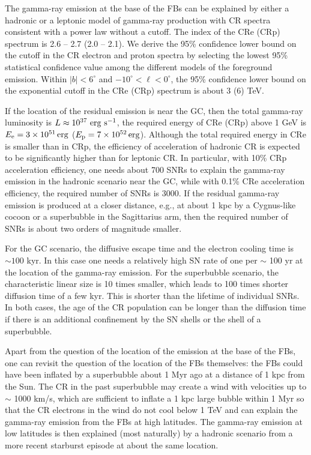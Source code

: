The gamma-ray emission at the base of the FBs can be explained by either a hadronic or a leptonic model of gamma-ray production
with CR spectra consistent with a power law without a cutoff.
The index of the CRe (CRp) spectrum is 2.6 -- 2.7 (2.0 -- 2.1).
We derive the 95\% confidence lower bound on the cutoff in the CR electron and proton spectra
by selecting the lowest 95\% statistical confidence value among the different models of the foreground emission.
Within $|b| < 6^\circ$ and $-10^\circ < \ell < 0^\circ$, the 95\% confidence lower bound on the 
exponential cutoff in the CRe (CRp) spectrum is
about 3 (6) TeV.

If the location of the residual emission is near the GC,
then the total gamma-ray luminosity is $L \approx 10^{37}\ {\rm erg\ s^{-1}}$,
the required energy of CRe (CRp) above 1 GeV is $E_{\rm e} = \SI{3e51}{erg}$
($E_{\rm p} = \SI{7e52}{erg}$).
Although the total required energy in CRe is smaller than in CRp,
the efficiency of acceleration of hadronic CR is expected to be significantly higher than for leptonic CR.
In particular, with 10\% CRp acceleration efficiency, one needs about 700 SNRs to explain the 
gamma-ray emission in the hadronic scenario near the GC,
while with 0.1\% CRe acceleration efficiency, the required number of SNRs is 3000.
If the residual gamma-ray emission is produced at a closer distance, e.g., at about 1 kpc
by a Cygnus-like cocoon or a superbubble in the Sagittarius arm, 
then the required number of SNRs is about two orders of magnitude smaller.

For the GC scenario, the diffusive escape time and the electron cooling time is $\sim 100$ kyr.
In this case one needs a relatively high SN rate of one per $\sim$ 100 yr at the location of the gamma-ray emission.
For the superbubble scenario, the characteristic linear size is 10 times smaller, which leads to 100 times shorter
diffusion time of a few kyr. This is shorter than the lifetime of individual SNRs.
In both cases, the age of the CR population can be longer than the diffusion time if there is an
additional confinement by the SN shells or the shell of a superbubble.

Apart from the question of the location of the emission at the base of the FBs,
one can revisit the question of the location of the FBs themselves:
the FBs could have been inflated by a superbubble about 1 Myr ago
at a distance of 1 kpc from the Sun.
The CR in the past superbubble may create a wind with velocities up to $\sim$ 1000 km/s, 
which are sufficient to inflate a 1 kpc large bubble within 1 Myr
so that the CR electrons in the wind do not cool below 1 TeV and can explain the
gamma-ray emission from the FBs at high latitudes.
The gamma-ray emission at low latitudes is then explained (most naturally) by a hadronic
scenario from a more recent starburst episode at about the same location.

